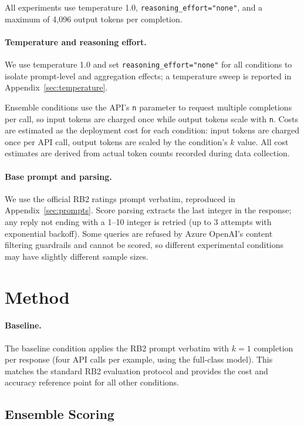 \documentclass{article}
\begin{document}
All experiments use temperature 1.0, \texttt{reasoning\_effort="none"}, and a maximum of 4,096 output tokens per completion.

\paragraph{Temperature and reasoning effort.} We use temperature 1.0 and set \texttt{reasoning\_effort="none"} for all conditions to isolate prompt-level and aggregation effects; a temperature sweep is reported in Appendix~\ref{sec:temperature}.

Ensemble conditions use the API's \texttt{n} parameter to request multiple completions per call, so input tokens are charged once while output tokens scale with \texttt{n}. Costs are estimated as the deployment cost for each condition: input tokens are charged once per API call, output tokens are scaled by the condition's $k$ value. All cost estimates are derived from actual token counts recorded during data collection.

\paragraph{Base prompt and parsing.} We use the official RB2 ratings prompt verbatim, reproduced in Appendix~\ref{sec:prompts}. Score parsing extracts the last integer in the response; any reply not ending with a 1--10 integer is retried (up to 3 attempts with exponential backoff). Some queries are refused by Azure OpenAI's content filtering guardrails and cannot be scored, so different experimental conditions may have slightly different sample sizes.

\section{Method}
\label{sec:methods}

\paragraph{Baseline.} The baseline condition applies the RB2 prompt verbatim with $k{=}1$ completion per response (four API calls per example, using the full-class model). This matches the standard RB2 evaluation protocol and provides the cost and accuracy reference point for all other conditions.

\subsection{Ensemble Scoring}
\label{sec:ensemble}
\end{document}
